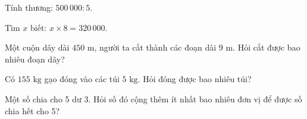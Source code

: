 \begin{ex} %
Tính thương: $500\,000 : 5$.
\end{ex}

\begin{ex} %
Tìm $x$ biết: $x \times 8 = 320\,000$.
\end{ex}

\begin{ex} %
Một cuộn dây dài $450\text{ m}$, người ta cắt thành các đoạn dài $9\text{ m}$. Hỏi cắt được bao nhiêu đoạn dây?
\end{ex}

\begin{ex} %
Có $155\text{ kg}$ gạo đóng vào các túi $5\text{ kg}$. Hỏi đóng được bao nhiêu túi?
\end{ex}

\begin{ex} %
Một số chia cho 5 dư 3. Hỏi số đó cộng thêm ít nhất bao nhiêu đơn vị để được số chia hết cho 5?
\end{ex}
